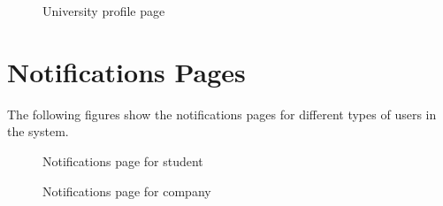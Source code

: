 \begin{figure}[H]
    \centering
    \caption*{University profile page}
\end{figure}

\section{Notifications Pages}
The following figures show the notifications pages for different types of users in the system.

\begin{figure}[H]
    \centering
    \caption*{Notifications page for student}
\end{figure}

\begin{figure}[H]
    \centering
    \caption*{Notifications page for company}
\end{figure}

